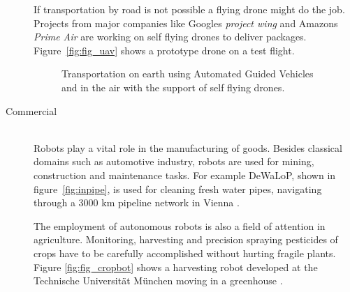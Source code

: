 \begin{description}
If transportation by road is not possible a flying drone might do the job. Projects from major companies like Googles \emph{project wing} and Amazons \emph{Prime Air} are working on self flying drones to deliver packages. 
Figure~\ref{fig:fig_uav} shows a prototype drone on a test flight. 

\begin{figure}[thpb]
	  \myfloatalign
      \footnotesize
      \centering
   \caption[Logistic robots]{Transportation on earth using Automated Guided Vehicles and in the air with the support of self flying drones.}
   \label{fig:fig_transport}
\end{figure}

\item[Commercial]\hfill \\
Robots play a vital role in the manufacturing of goods. Besides classical domains such as  automotive industry, robots are used for mining, construction and maintenance tasks. 
For example DeWaLoP, shown in figure~\ref{fig:inpipe}, is used for cleaning fresh water pipes, navigating through a 3000 km pipeline network in Vienna \cite{mateos2013inpipe}.   

The employment of autonomous robots is also a field of attention in agriculture. 
Monitoring, harvesting and precision spraying pesticides of crops have to be carefully accomplished without hurting fragile plants. 
Figure \ref{fig:fig_cropbot} shows a harvesting robot developed at the Technische Universit\"at M\"unchen moving in a greenhouse \cite{Schuetz2014}.


\end{description}
